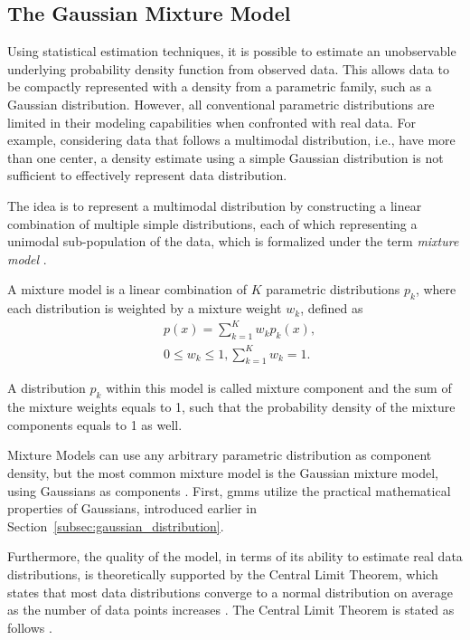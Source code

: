 \documentclass[../../../main.tex]{subfiles}
\begin{document}
\subsection{The Gaussian Mixture Model} \label{subsec:gaussian_mixture_model}

Using statistical estimation techniques, it is possible to estimate an unobservable underlying probability density function from observed data. This allows data to be compactly represented with a density from a parametric family, such as a Gaussian distribution. However, all conventional parametric distributions are limited in their modeling capabilities when confronted with real data. For example, considering data that follows a multimodal distribution, i.e., have more than one center, a density estimate using a simple Gaussian distribution is not sufficient to effectively represent data distribution.

The idea is to represent a multimodal distribution by constructing a linear combination of multiple simple distributions, each of which representing a unimodal sub-population of the data, which is formalized under the term \textit{mixture model} \cite[p.111]{bis_2006}.

\begin{definition} \label{th:mixture_model}
A mixture model is a linear combination of $K$ parametric distributions $p_k$, where each distribution is weighted by a mixture weight $w_k$, defined as
\begin{align*}
    &p(x) = \sum\limits_{k=1}^K w_k p_k (x), \\
    &0 \leq w_k \leq 1, \sum\limits_{k=1}^K w_k = 1.
\end{align*}
\end{definition}

A distribution $p_k$ within this model is called mixture component and the sum of the mixture weights equals to 1, such that the probability density of the mixture components equals to 1 as well. 

Mixture Models can use any arbitrary parametric distribution as component density, but the most common mixture model is the Gaussian mixture model, using Gaussians as components \cite[214]{has_2009}. First, \acrshort{gmm}s utilize the practical mathematical properties of Gaussians, introduced earlier in Section~\ref{subsec:gaussian_distribution}. 

Furthermore, the quality of the model, in terms of its ability to estimate real data distributions, is theoretically supported by the Central Limit Theorem, which states that most data distributions converge to a normal distribution on average as the number of data points increases \cite[p.222]{jay_2003}. The Central Limit Theorem is stated as follows \cite[241]{montgomery_2010}.
\end{document}
